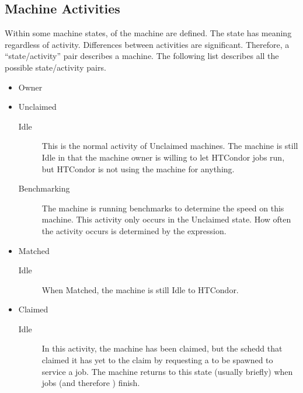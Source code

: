 \subsection{\label{sec:Activities}
Machine Activities}

Within some machine states,
 of the machine are defined.
The state has meaning regardless of activity.
Differences between activities are significant.
Therefore, a ``state/activity'' pair describes
a machine.
The following list describes all the possible state/activity pairs.

\begin{itemize}

\item Owner

\item Unclaimed
\begin{description}
  \item[Idle] This is the normal activity of Unclaimed machines.
    The machine is still Idle in that the machine owner is willing to
    let HTCondor jobs run, but HTCondor is not using the
    machine for anything.
  
  \item[Benchmarking] The machine is running benchmarks to
    determine the speed on this machine.
    This activity only occurs in the Unclaimed state.
    How often the activity occurs is
    determined by the  expression.
\end{description}

\item Matched
\begin{description}
  \item[Idle] When Matched, the machine is still Idle to HTCondor.
\end{description}

\item Claimed
\begin{description}
\item[Idle] In this activity, the machine has been claimed, but the
  schedd that claimed it has yet to  the claim by
  requesting a  to be spawned to service a job.
  The machine returns to this state (usually briefly) when jobs
  (and therefore ) finish.
  

\end{description}
\end{itemize}
